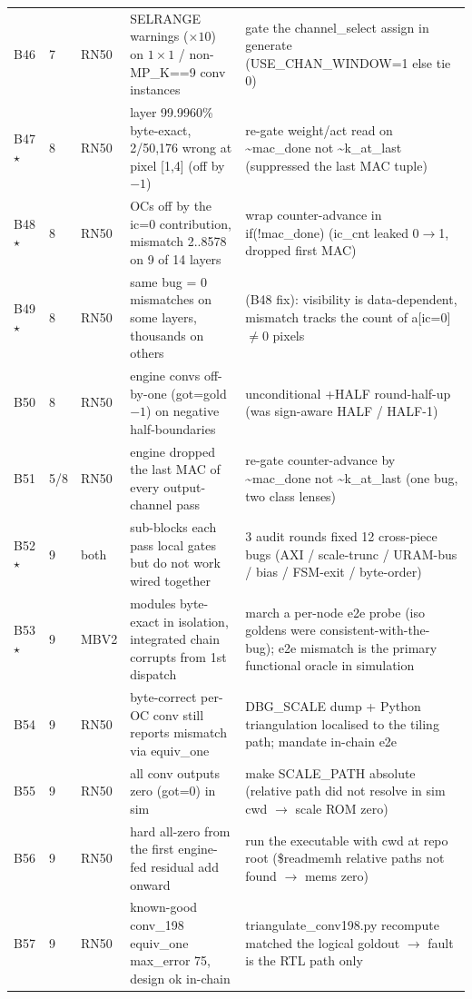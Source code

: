 \begin{footnotesize}
\begin{longtable}{@{}l l l p{} p{}@{}}
B46 & 7 & RN50 & SELRANGE warnings ($\times10$) on $1\times1$ / non-MP\_K==9 conv instances & gate the channel\_select assign in generate (USE\_CHAN\_WINDOW=1 else tie 0) \\
B47 $\star$ & 8 & RN50 & layer 99.9960\% byte-exact, 2/50,176 wrong at pixel [1,4] (off by $-1$) & re-gate weight/act read on \textasciitilde{}mac\_done not \textasciitilde{}k\_at\_last (suppressed the last MAC tuple) \\
B48 $\star$ & 8 & RN50 & OCs off by the ic=0 contribution, mismatch 2..8578 on 9 of 14 layers & wrap counter-advance in if(!mac\_done) (ic\_cnt leaked 0$\rightarrow$1, dropped first MAC) \\
B49 $\star$ & 8 & RN50 & same bug = 0 mismatches on some layers, thousands on others & (B48 fix): visibility is data-dependent, mismatch tracks the count of a[ic=0]$\neq$0 pixels \\
B50 & 8 & RN50 & engine convs off-by-one (got=gold$-1$) on negative half-boundaries & unconditional +HALF round-half-up (was sign-aware HALF / HALF-1) \\
B51 & 5/8 & RN50 & engine dropped the last MAC of every output-channel pass & re-gate counter-advance by \textasciitilde{}mac\_done not \textasciitilde{}k\_at\_last (one bug, two class lenses) \\
B52 $\star$ & 9 & both & sub-blocks each pass local gates but do not work wired together & 3 audit rounds fixed 12 cross-piece bugs (AXI / scale-trunc / URAM-bus / bias / FSM-exit / byte-order) \\
B53 $\star$ & 9 & MBV2 & modules byte-exact in isolation, integrated chain corrupts from 1st dispatch & march a per-node e2e probe (iso goldens were consistent-with-the-bug); e2e mismatch is the primary functional oracle in simulation \\
B54 & 9 & RN50 & byte-correct per-OC conv still reports mismatch via equiv\_one & DBG\_SCALE dump + Python triangulation localised to the tiling path; mandate in-chain e2e \\
B55 & 9 & RN50 & all conv outputs zero (got=0) in sim & make SCALE\_PATH absolute (relative path did not resolve in sim cwd $\rightarrow$ scale ROM zero) \\
B56 & 9 & RN50 & hard all-zero from the first engine-fed residual add onward & run the executable with cwd at repo root (\$readmemh relative paths not found $\rightarrow$ mems zero) \\
B57 & 9 & RN50 & known-good conv\_198 equiv\_one max\_error 75, design ok in-chain & triangulate\_conv198.py recompute matched the logical goldout $\rightarrow$ fault is the RTL path only \\

\end{longtable}
\end{footnotesize}
